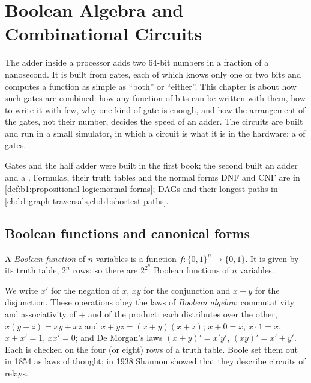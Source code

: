 \chapter{Boolean Algebra and Combinational Circuits}\label{ch:b1:combinational-circuits}

The adder inside a processor adds two 64-bit numbers in a fraction of a nanosecond. It is built from gates, each of
which knows only one or two bits and computes a function as simple as ``both'' or ``either''. This chapter is about how
such gates are combined: how any function of bits can be written with them, how to write it with few, why one kind of
gate is enough, and how the arrangement of the gates, not their number, decides the speed of an adder. The circuits
are built and run in a small simulator, in which a circuit is what it is in the hardware: a  of
gates.

\begin{recall}
Gates and the half adder were built in the first book; the second built an adder and a . Formulas, their
truth tables and the normal forms DNF and CNF are in \cref{def:b1:propositional-logic:normal-forms}; DAGs and their
longest paths in \cref{ch:b1:graph-traversals,ch:b1:shortest-paths}.
\end{recall}

\section{Boolean functions and canonical forms}\label{sec:b1:combinational-circuits:functions}

\begin{definition}\label{def:b1:combinational-circuits:boolean-function}
A \emph{Boolean function} of $n$ variables is a function $f\colon \{0, 1\}^n \to \{0, 1\}$. It is
given by its truth table, $2^n$ rows; so there are $2^{2^n}$ Boolean functions of $n$ variables.
\end{definition}

We write $x'$ for the negation of $x$, $xy$ for the conjunction and $x + y$ for the disjunction. These operations obey
the laws of \emph{Boolean algebra}: commutativity and associativity of $+$ and of the product;
each distributes over the other, $x(y + z) = xy + xz$ and $x + yz = (x + y)(x + z)$; $x + 0 = x$, $x \cdot 1 = x$, $x + x'
= 1$, $x x' = 0$; and De Morgan's laws $(x + y)' = x' y'$, $(xy)' = x' + y'$. Each is checked on the four (or eight)
rows of a truth table. Boole set them out in 1854 as laws of thought; in 1938 Shannon showed that they describe
circuits of relays.

